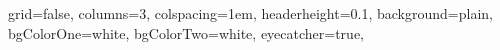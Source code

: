 \documentclass[a0paper,portrait,fontscale=0.3]{baposter}
\begin{document}

\begin{poster}{
%
%
%
%
%       
%
%
%
%
grid=false,
columns=3,
colspacing=1em,
headerheight=0.1\textheight,
background=plain,
bgColorOne=white,
bgColorTwo=white,
eyecatcher=true,
%
%
%
}
\end{poster}
\end{document}
